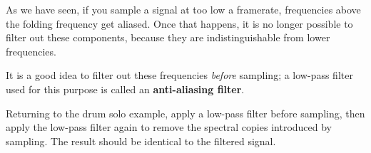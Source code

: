 \begin{exercise}
	As we have seen, if you sample a signal at too low a
	framerate, frequencies above the folding frequency get aliased.
	Once that happens, it is no longer possible to filter out
	these components, because they are indistinguishable from
	lower frequencies.
	
	It is a good idea to filter out these frequencies {\em before}
	sampling; a low-pass filter used for this purpose is called
	an {\bf anti-aliasing filter}.
	
	Returning to the drum solo example, apply a low-pass filter
	before sampling, then apply the low-pass filter again to remove
	the spectral copies introduced by sampling.  The result should
	be identical to the filtered signal.
\end{exercise}
